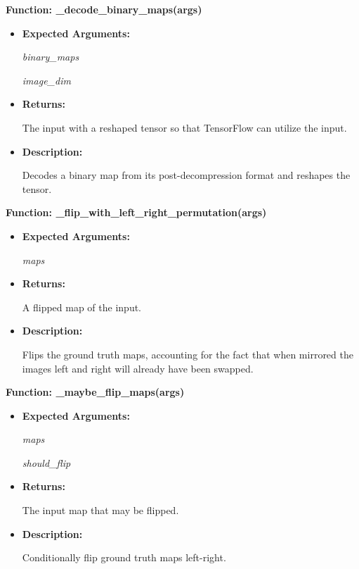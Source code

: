 \documentclass{scrreprt}
\begin{document}
\textbf{Function: \_decode\_binary\_maps(args)}
\begin{itemize}
    \item \textbf{Expected Arguments:}

            \quad\textit{binary\_maps}

            \quad\textit{image\_dim}

    \item \textbf{Returns:}

            The input with a reshaped tensor so that TensorFlow can utilize the input.

    \item \textbf{Description:}

            Decodes a binary map from its post-decompression format and reshapes the tensor.

\end{itemize}

\textbf{Function: \_flip\_with\_left\_right\_permutation(args)}
\begin{itemize}
    \item \textbf{Expected Arguments:}

            \quad\textit{maps}

    \item \textbf{Returns:}

            A flipped map of the input.

    \item \textbf{Description:}

            Flips the ground truth maps, accounting for the fact that when mirrored the images left and right will already have been swapped.

\end{itemize}

\textbf{Function: \_maybe\_flip\_maps(args)}
\begin{itemize}
    \item \textbf{Expected Arguments:}

            \quad\textit{maps}

            \quad\textit{should\_flip}

    \item \textbf{Returns:}

            The input map that may be flipped.

    \item \textbf{Description:}

            Conditionally flip ground truth maps left-right.

\end{itemize}
\end{document}
